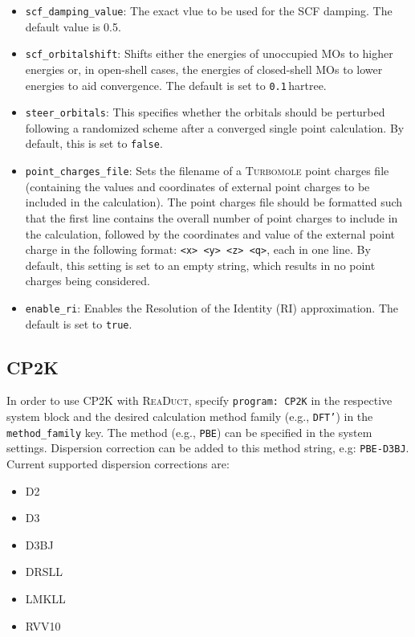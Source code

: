 \documentclass[]{tufte-book}
\begin{document}
\begin{itemize}
\item \texttt{scf\_damping\_value}: The exact vlue to be used for the SCF damping. The default value is 0.5.
\item \texttt{scf\_orbitalshift}: Shifts either the energies of unoccupied MOs to higher energies or, in open-shell cases, the energies of closed-shell MOs to lower energies to aid convergence. The default is set to \texttt{0.1}\,hartree.
\item \texttt{steer\_orbitals}: This specifies whether the orbitals should be perturbed  following a randomized scheme after a converged single point calculation\cite{orbitalperturbation}. By default, this is set to \texttt{false}.
\item \texttt{point\_charges\_file}: Sets the filename of a \textsc{Turbomole} point charges file (containing the values and coordinates of
external point charges to be included in the calculation). The point charges file should be formatted such that the first line contains the overall number of point charges to include in the calculation, followed by the coordinates and value of the external point charge in the following format: \texttt{<x> <y> <z> <q>}, each in one line. By default, this setting is set to an empty string, which results
in no point charges being considered.
\item \texttt{enable\_ri}: Enables the Resolution of the Identity (RI) approximation. The default is set to \texttt{true}. 
\end{itemize}

\subsection{\textsc{CP2K}}

In order to use \textsc{CP2K} with \textsc{ReaDuct}, specify \texttt{program: CP2K} in the respective system block and the desired
calculation method family (e.g., \texttt{DFT'}) in the \texttt{method\_family} key.
The method (e.g., \texttt{PBE}) can be specified in the system settings. Dispersion correction can be added to this method string, e.g: \texttt{PBE-D3BJ}. Current supported dispersion corrections are:
\begin{itemize}
 	\item D2
 	\item D3
 	\item D3BJ
 	\item DRSLL
 	\item LMKLL
 	\item RVV10
\end{itemize}
\end{document}
